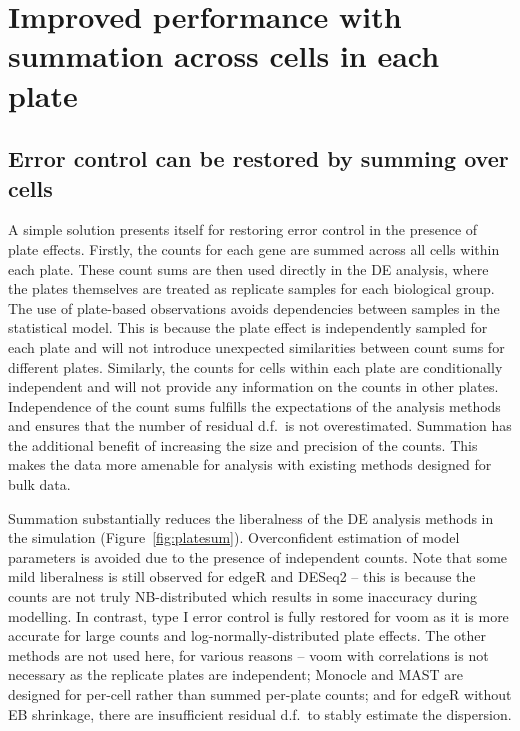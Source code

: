 \documentclass[oupdraft]{bio}
\begin{document}
\section{Improved performance with summation across cells in each plate}

\subsection{Error control can be restored by summing over cells}
A simple solution presents itself for restoring error control in the presence of plate effects.
Firstly, the counts for each gene are summed across all cells within each plate.
These count sums are then used directly in the DE analysis, where the plates themselves are treated as replicate samples for each biological group.
The use of plate-based observations avoids dependencies between samples in the statistical model.
This is because the plate effect is independently sampled for each plate and will not introduce unexpected similarities between count sums for different plates.
Similarly, the counts for cells within each plate are conditionally independent and will not provide any information on the counts in other plates.
Independence of the count sums fulfills the expectations of the analysis methods and ensures that the number of residual d.f.\ is not overestimated.
Summation has the additional benefit of increasing the size and precision of the counts.
This makes the data more amenable for analysis with existing methods designed for bulk data.


Summation substantially reduces the liberalness of the DE analysis methods in the simulation (Figure~\ref{fig:platesum}).
Overconfident estimation of model parameters is avoided due to the presence of independent counts.
Note that some mild liberalness is still observed for edgeR and DESeq2 
    -- this is because the counts are not truly NB-distributed which results in some inaccuracy during modelling.
In contrast, type I error control is fully restored for voom as it is more accurate for large counts and log-normally-distributed plate effects.
The other methods are not used here, for various reasons -- voom with correlations is not necessary as the replicate plates are independent;
    Monocle and MAST are designed for per-cell rather than summed per-plate counts;
    and for edgeR without EB shrinkage, there are insufficient residual d.f.\ to stably estimate the dispersion.
\end{document}

